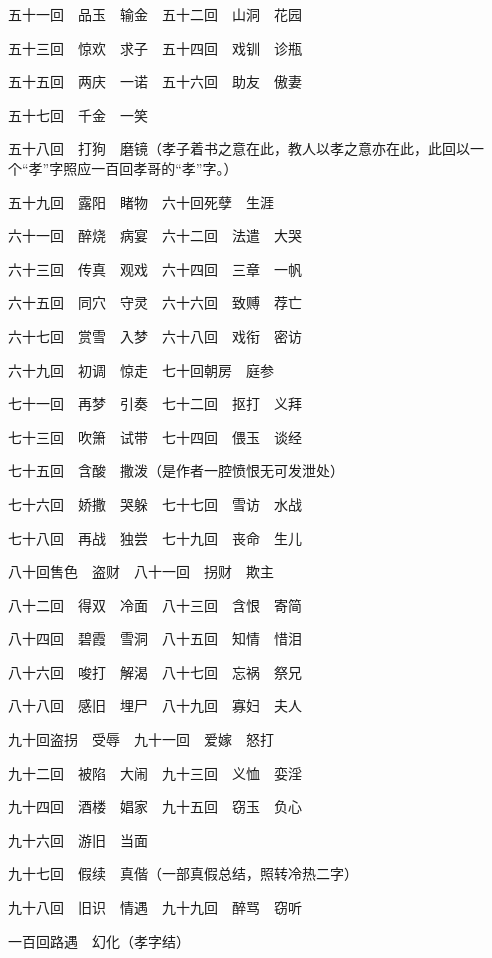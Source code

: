 {五十一回　品玉　输金　五十二回　山洞　花园

五十三回　惊欢　求子　五十四回　戏钏　诊瓶

五十五回　两庆　一诺　五十六回　助友　傲妻

五十七回　千金　一笑

五十八回　打狗　磨镜（孝子着书之意在此，教人以孝之意亦在此，此回以一个“孝”字照应一百回孝哥的“孝”字。）

五十九回　露阳　睹物　六十回死孽　生涯

六十一回　醉烧　病宴　六十二回　法遣　大哭

六十三回　传真　观戏　六十四回　三章　一帆

六十五回　同穴　守灵　六十六回　致赙　荐亡

六十七回　赏雪　入梦　六十八回　戏衔　密访

六十九回　初调　惊走　七十回朝房　庭参

七十一回　再梦　引奏　七十二回　抠打　义拜

七十三回　吹箫　试带　七十四回　偎玉　谈经

七十五回　含酸　撒泼（是作者一腔愤恨无可发泄处）

七十六回　娇撒　哭躲　七十七回　雪访　水战

七十八回　再战　独尝　七十九回　丧命　生儿

八十回售色　盗财　八十一回　拐财　欺主

八十二回　得双　冷面　八十三回　含恨　寄简

八十四回　碧霞　雪洞　八十五回　知情　惜泪

八十六回　唆打　解渴　八十七回　忘祸　祭兄

八十八回　感旧　埋尸　八十九回　寡妇　夫人

九十回盗拐　受辱　九十一回　爱嫁　怒打

九十二回　被陷　大闹　九十三回　义恤　娈淫

九十四回　酒楼　娼家　九十五回　窃玉　负心

九十六回　游旧　当面

九十七回　假续　真偕（一部真假总结，照转冷热二字）

九十八回　旧识　情遇　九十九回　醉骂　窃听

一百回路遇　幻化（孝字结）

} %

